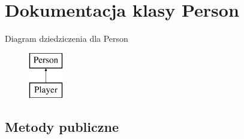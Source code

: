 \hypertarget{class_person}{\section{Dokumentacja klasy Person}
\label{class_person}
}
Diagram dziedziczenia dla Person\begin{figure}[H]
\begin{center}
\leavevmode
\includegraphics[height=2.000000cm]{class_person}
\end{center}
\end{figure}
\subsection*{Metody publiczne}

